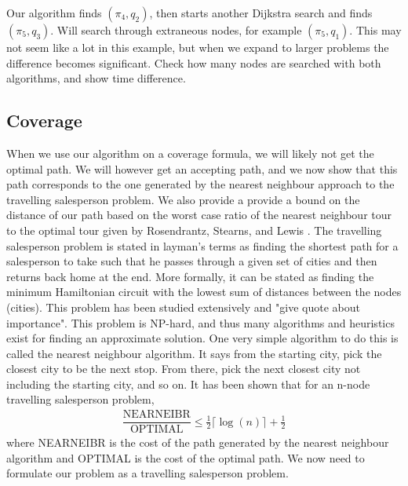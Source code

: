 Our algorithm finds $(\pi_4,q_2)$, then starts another Dijkstra search and finds $(\pi_5,q_3)$. Will search through extraneous nodes, for example $(\pi_5,q_1)$. This may not seem like a lot in this example, but when we expand to larger problems the difference becomes significant. Check how many nodes are searched with both algorithms, and show time difference.

\subsection{Coverage}
When we use our algorithm on a coverage formula, we will likely not get the optimal path. We will however get an accepting path, and we now show that this path corresponds to the one generated by the nearest neighbour approach to the travelling salesperson problem. We also provide a provide a bound on the distance of our path based on the worst case ratio of the nearest neighbour tour to the optimal tour given by Rosendrantz, Stearns, and Lewis \cite{rosenkrantz74}. The travelling salesperson problem is stated in layman's terms as finding the shortest path for a salesperson to take such that he passes through a given set of cities and then returns back home at the end. More formally, it can be stated as finding the minimum Hamiltonian circuit with the lowest sum of distances between the nodes (cities). This problem has been studied extensively and "give quote about importance". This problem is NP-hard, and thus many algorithms and heuristics exist for finding an approximate solution. One very simple algorithm to do this is called the nearest neighbour algorithm. It says from the starting city, pick the closest city to be the next stop. From there, pick the next closest city not including the starting city, and so on. It has been shown that for an n-node travelling salesperson problem, 
\begin{align*}
\dfrac{\text{NEARNEIBR}}{\text{OPTIMAL}} \leq \frac{1}{2} \lceil \log(n) \rceil + \frac{1}{2}
\end{align*}
where NEARNEIBR is the cost of the path generated by the nearest neighbour algorithm and OPTIMAL is the cost of the optimal path. We now need to formulate our problem as a travelling salesperson problem.
